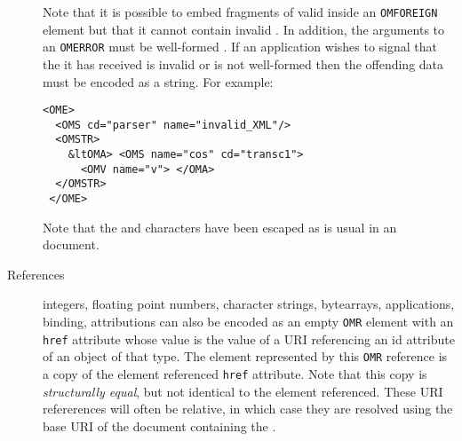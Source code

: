 \begin{description}
  Note that it is possible to embed fragments of valid \OM inside an \lstinline|OMFOREIGN|
  element but that it cannot contain invalid \OM.  In addition, the arguments to an
  \lstinline|OMERROR| must be well-formed \XML.  If an application wishes to signal that
  the \OM it has received is invalid or is not well-formed then the offending data must be
  encoded as a string.  For example:
\begin{lstlisting}
<OME>
  <OMS cd="parser" name="invalid_XML"/>  
  <OMSTR>
    &ltOMA> <OMS name="cos" cd="transc1">
      <OMV name="v"> </OMA>
  </OMSTR> 
 </OME>
\end{lstlisting}
  Note that the \textquote{<} and \textquote{>} characters have been escaped as is usual in
  an \XML document.
\item[References] \OM integers, floating point numbers, character strings, bytearrays,
  applications, binding, attributions can also be encoded as an empty \lstinline|OMR|
  element with an \lstinline|href| attribute whose value is the value of a URI referencing
  an id attribute of an \OM object of that type.  The \OM element represented by this
  \lstinline|OMR| reference is a copy of the \OM element referenced \lstinline|href|
  attribute. Note that this copy is \emph{structurally equal}, but not identical to the
  element referenced. These URI refererences will often be relative, in which case they
  are resolved using the base URI of the document containing the \OM.


\end{description}
